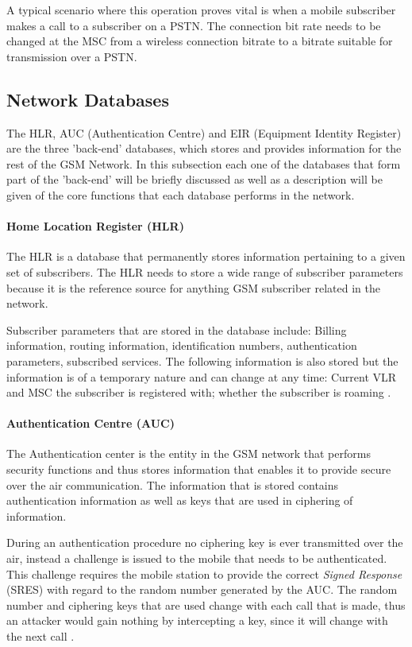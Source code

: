A typical scenario where this operation proves vital is when a mobile subscriber makes a call to a subscriber on a PSTN. The connection bit rate needs to be changed at the MSC from a wireless connection bitrate to a bitrate suitable for transmission over a PSTN.

\subsection{Network Databases}
The HLR, AUC (Authentication Centre) and EIR (Equipment Identity Register) are the three 'back-end' databases, which stores and provides information for the rest of the GSM Network. In this subsection each one of the databases that form part of the 'back-end' will be briefly discussed as well as a description will be given of the core functions that each database performs in the network.

\paragraph{Home Location Register (HLR)}
The HLR is a database that permanently stores information pertaining to a given set of subscribers. The HLR needs to store a wide range of subscriber parameters because it is the reference source for anything GSM subscriber related in the network. 

Subscriber parameters that are stored in the database include: Billing information, routing information, identification numbers, authentication parameters, subscribed services. The following information is also stored but the information is of a temporary nature and can change at any time: Current VLR and MSC the subscriber is registered with; whether the subscriber is roaming \cite{GSMSysEngin}.

\paragraph{Authentication Centre (AUC)}
The Authentication center is the entity in the GSM network that performs security functions and thus stores information that enables it to provide secure over the air communication\cite{GSM92,GSMSysEngin}. The information that is stored contains authentication information as well as keys that are used in ciphering of information\cite{GSM92,GSMSysEngin}.

During an authentication procedure no ciphering key is ever transmitted over the air, instead a challenge is issued to the mobile that needs to be authenticated. This challenge requires the mobile station to provide the correct \emph{Signed Response} (SRES) with regard to the random number generated by the AUC\cite{GSM92,GSMSysEngin}. The random number and ciphering keys that are used change with each call that is made, thus an attacker would gain nothing by intercepting a key, since it will change with the next call \cite{GSMSysEngin}.

